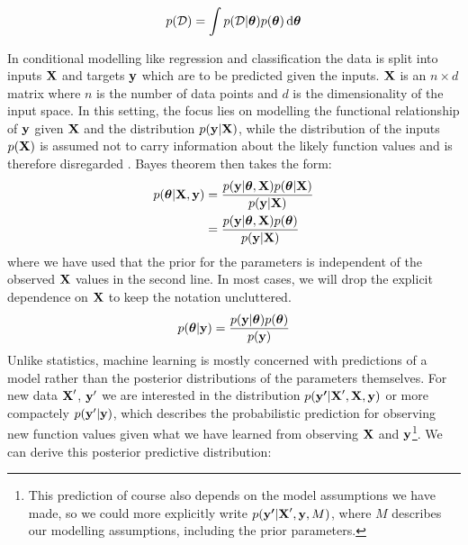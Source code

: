 \documentclass[../thesis.tex]{subfiles}
\begin{document}
\begin{equation}
    \begin{split}
        p(\mathcal{D}) = \int p(\mathcal{D} | \boldsymbol{\mathbf{\theta}}) p(\boldsymbol{\mathbf{\theta}}) \mathop{}\!\mathrm{d} \boldsymbol{\mathbf{\theta}}
    \end{split}
\end{equation}

In conditional modelling like regression and classification the data is split into inputs $\boldsymbol{\mathbf{X}}$ and targets $\boldsymbol{\mathbf{y}}$ which are to be predicted given the inputs. $\boldsymbol{\mathbf{X}}$ is an $n \times d$ matrix where $n$ is the number of data points and $d$ is the dimensionality of the input space. In this setting, the focus lies on modelling the functional relationship of $\boldsymbol{\mathbf{y}}$ given $\boldsymbol{\mathbf{X}}$ and the distribution $p(\boldsymbol{\mathbf{y}} | \boldsymbol{\mathbf{X}})$, while the distribution of the inputs $p(\boldsymbol{\mathbf{X}})$ is assumed not to carry information about the likely function values and is therefore disregarded \parencite[Chapter~14.1]{gelman2014bayesian}. Bayes theorem then takes the form:
\begin{equation}
    \begin{split}
        p(\boldsymbol{\mathbf{\theta}} | \boldsymbol{\mathbf{X}}, \boldsymbol{\mathbf{y}}) &= \frac{p(\boldsymbol{\mathbf{y}} | \boldsymbol{\mathbf{\theta}}, \boldsymbol{\mathbf{X}}) p(\boldsymbol{\mathbf{\theta}} | \boldsymbol{\mathbf{X}})}  {p(\boldsymbol{\mathbf{y}} | \boldsymbol{\mathbf{X}})} \\
        &= \frac{p(\boldsymbol{\mathbf{y}} | \boldsymbol{\mathbf{\theta}}, \boldsymbol{\mathbf{X}}) p(\boldsymbol{\mathbf{\theta}})}  {p(\boldsymbol{\mathbf{y}} | \boldsymbol{\mathbf{X}})}
    \end{split}
\end{equation}
where we have used that the prior for the parameters is independent of the observed $\boldsymbol{\mathbf{X}}$ values in the second line. In most cases, we will drop the explicit dependence on $\boldsymbol{\mathbf{X}}$ to keep the notation uncluttered.
\begin{equation}
    \begin{split}
        p(\boldsymbol{\mathbf{\theta}} | \boldsymbol{\mathbf{y}}) = \frac{p(\boldsymbol{\mathbf{y}} | \boldsymbol{\mathbf{\theta}}) p(\boldsymbol{\mathbf{\theta}})}  {p(\boldsymbol{\mathbf{y}})}
    \end{split}
\end{equation}
Unlike statistics, machine learning is mostly concerned with predictions of a model rather than the posterior distributions of the parameters themselves. For new data $\boldsymbol{\mathbf{X}}'$, $\boldsymbol{\mathbf{y}}'$ we are interested in the distribution $p(\boldsymbol{\mathbf{y'}} | \boldsymbol{\mathbf{X}}', \boldsymbol{\mathbf{X}}, \boldsymbol{\mathbf{y}})$ or more compactely $p(\boldsymbol{\mathbf{y}}' | \boldsymbol{\mathbf{y}})$, which describes the probabilistic prediction for observing new function values given what we have learned from observing $\boldsymbol{\mathbf{X}}$ and $\boldsymbol{\mathbf{y}}$\footnote{This prediction of course also depends on the model assumptions we have made, so we could more explicitly write $p(\boldsymbol{\mathbf{y'}} | \boldsymbol{\mathbf{X}}', \boldsymbol{\mathbf{y}}, M)$, where $M$ describes our modelling assumptions, including the prior parameters.}. We can derive this posterior predictive distribution:
\end{document}
